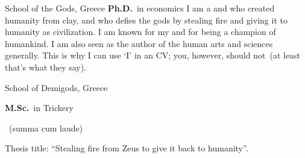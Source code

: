 	{%
		School of the Gods, Greece}
	{%
		\textbf{Ph.D.}~in economics}
	{%
	I am a  and  who created humanity from clay, and who defies the gods by stealing fire and giving it to humanity as civilization. I am known for my  and for being a champion of humankind. I am also seen as the author of the human arts and sciences generally. This is why I can use `I' in an CV; you, however, should not~(at least that's what they say).}

		{%
			School of Demigods, Greece}
		{%
			\textbf{M.Sc.}~in Trickery\begin{footnotesize}
				~(summa cum laude)
			\end{footnotesize}}
		{%
		Thesis title: ``Stealing fire from Zeus to give it back to humanity''.}